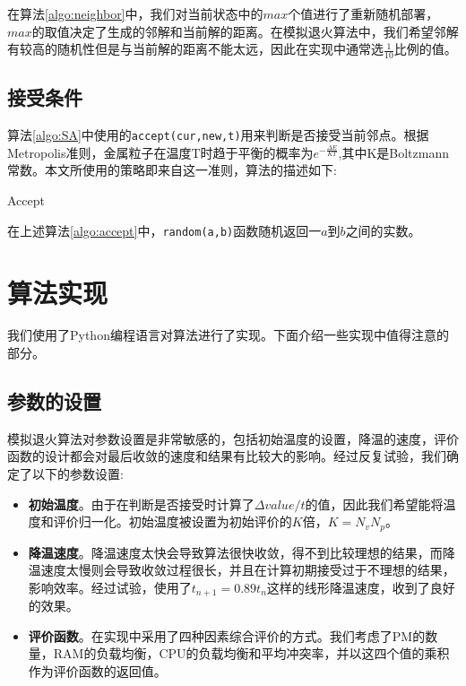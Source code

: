 在算法\ref{algo:neighbor}中，我们对当前状态中的$max$个值进行了重新随机部署，$max$的取值决定了生成的邻解和当前解的距离。在模拟退火算法中，我们希望邻解有较高的随机性但是与当前解的距离不能太远，因此在实现中通常选$\frac{1}{10}$比例的值。

\subsection{接受条件}
\label{sec:accept}
算法\ref{algo:SA}中使用的\texttt{accept(cur,new,t)}用来判断是否接受当前邻点。根据Metropolis准则，金属粒子在温度T时趋于平衡的概率为$e^{-\frac{\Delta E}{KT}}$,其中K是Boltzmann常数。本文所使用的策略即来自这一准则，算法的描述如下:
\begin{algorithm}[H]
  \DontPrintSemicolon
  
  \caption{Accept\label{algo:accept}}
\end{algorithm}
在上述算法\ref{algo:accept}中，\texttt{random(a,b)}函数随机返回一$a$到$b$之间的实数。

\section{算法实现}
\label{sec:implementation}

我们使用了Python编程语言对算法进行了实现。下面介绍一些实现中值得注意的部分。

\subsection{参数的设置}
\label{sec:config}

模拟退火算法对参数设置是非常敏感的，包括初始温度的设置，降温的速度，评价函数的设计都会对最后收敛的速度和结果有比较大的影响。经过反复试验，我们确定了以下的参数设置:

\begin{itemize}
\item \textbf{初始温度}。由于在判断是否接受时计算了$\Delta value/t$的值，因此我们希望能将温度和评价归一化。初始温度被设置为初始评价的$K$倍，$K = N_v N_p$。
\item \textbf{降温速度}。降温速度太快会导致算法很快收敛，得不到比较理想的结果，而降温速度太慢则会导致收敛过程很长，并且在计算初期接受过于不理想的结果，影响效率。经过试验，使用了$t_{n+1} = 0.89t_n$这样的线形降温速度，收到了良好的效果。
\item \textbf{评价函数}。在实现中采用了四种因素综合评价的方式。我们考虑了PM的数量，RAM的负载均衡，CPU的负载均衡和平均冲突率，并以这四个值的乘积作为评价函数的返回值。\label{evalutation}
\end{itemize}

